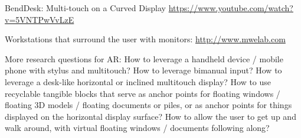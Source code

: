 BendDesk: Multi-touch on a Curved Display
\url{https://www.youtube.com/watch?v=5VNTPwVvLzE}
 
Workstations that surround the user with monitors:
\url{http://www.mwelab.com}
 
 
 
More research questions for AR:
How to leverage a handheld device / mobile phone with stylus and multitouch? How to leverage bimanual input?
How to leverage a desk-like horizontal or inclined multitouch display?
How to use recyclable tangible blocks that serve as anchor points for floating windows / floating 3D models / floating documents or piles, or as anchor points for things displayed on the horizontal display surface?
How to allow the user to get up and walk around, with virtual floating windows / documents following along?